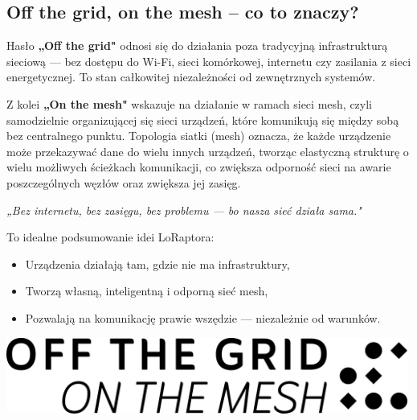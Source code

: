 \subsection{Off the grid, on the mesh – co to znaczy?}

Hasło \textbf{„Off the grid"} odnosi się do działania poza tradycyjną infrastrukturą sieciową --- bez dostępu do Wi-Fi, sieci komórkowej, internetu czy zasilania z sieci energetycznej. To stan całkowitej niezależności od zewnętrznych systemów.

Z kolei \textbf{„On the mesh"} wskazuje na działanie w ramach sieci mesh, czyli samodzielnie organizującej się sieci urządzeń, które komunikują się między sobą bez centralnego punktu. Topologia siatki (mesh) oznacza, że każde urządzenie może przekazywać dane do wielu innych urządzeń, tworząc elastyczną strukturę o wielu możliwych ścieżkach komunikacji, co zwiększa odporność sieci na awarie poszczególnych węzłów oraz zwiększa jej zasięg.

\begin{tcolorbox}[
	colback=gray!5!white, 
	colframe=gray!75!black, 
	boxrule=0.8pt, 
	arc=5pt,
	enhanced,
	drop shadow,
	top=8pt,
	bottom=8pt,
	center
]
	\begin{center}
		\emph{„Bez internetu, bez zasięgu, bez problemu --- bo nasza sieć działa sama."}
	\end{center}
\end{tcolorbox}

\vspace{0.3cm}

To idealne podsumowanie idei LoRaptora:
\begin{itemize}
	\item Urządzenia działają tam, gdzie nie ma infrastruktury,
	\item Tworzą własną, inteligentną i odporną sieć mesh,
	\item Pozwalają na komunikację prawie wszędzie --- niezależnie od warunków.
\end{itemize}

\vspace{1cm}
\begin{center}
\includegraphics[height=2.5cm]{root/LoRaptorHeader.png}
\end{center}